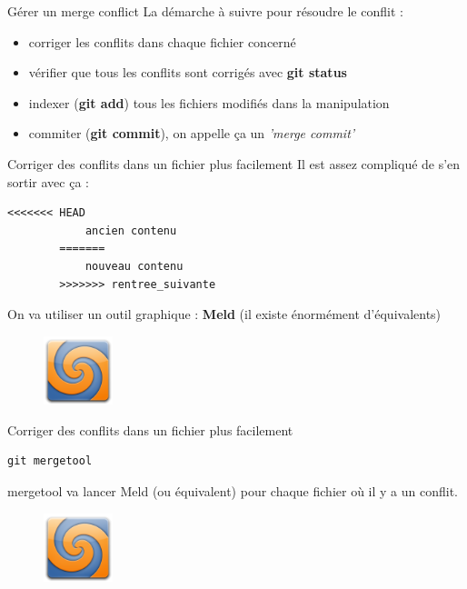 \documentclass{beamer}
\begin{document}
\begin{frame}[fragile]{Gérer un merge conflict}
	La démarche à suivre pour résoudre le conflit :
	\begin{itemize}
		\item corriger les conflits dans chaque fichier concerné
		\item vérifier que tous les conflits sont corrigés avec \textbf{git status}
		\item indexer (\textbf{git add}) tous les fichiers modifiés dans la manipulation
		\item commiter (\textbf{git commit}), on appelle ça un \textit{'merge commit'}
	\end{itemize}
\end{frame}

\begin{frame}[fragile]{Corriger des conflits dans un fichier plus facilement}
	Il est assez compliqué de s'en sortir avec ça :
	\begin{lstlisting}[frame=single]
		<<<<<<< HEAD
		    ancien contenu
		=======
		    nouveau contenu
		>>>>>>> rentree_suivante
	\end{lstlisting}
	
	On va utiliser un outil graphique : \textbf{Meld} (il existe énormément d'équivalents)
	\begin{figure}
		\centering
		\includegraphics[height=2cm]{img/meld}
	\end{figure}
\end{frame}

\begin{frame}[fragile]{Corriger des conflits dans un fichier plus facilement}
	
	\begin{lstlisting}[frame=single]
		git mergetool
	\end{lstlisting}
	mergetool va lancer Meld (ou équivalent) pour chaque fichier où il y a un conflit.
	\begin{figure}
		\centering
		\includegraphics[height=2cm]{img/meld}
	\end{figure}
\end{frame}
\end{document}
